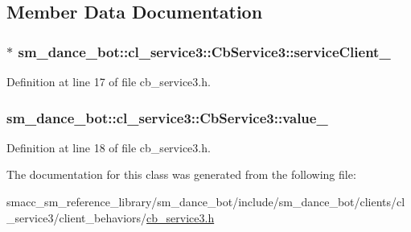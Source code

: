 \subsection{Member Data Documentation}
\subsubsection[{\texorpdfstring{service\+Client\+\_\+}{serviceClient_}}]{$\ast$ sm\+\_\+dance\+\_\+bot\+::cl\+\_\+service3\+::\+Cb\+Service3\+::service\+Client\+\_\+\hspace{0.3cm}{\ttfamily [private]}}\hypertarget{classsm__dance__bot_1_1cl__service3_1_1CbService3_aad53b5aa5eb595c5add3701cfe72079c}{}\label{classsm__dance__bot_1_1cl__service3_1_1CbService3_aad53b5aa5eb595c5add3701cfe72079c}


Definition at line 17 of file cb\+\_\+service3.\+h.

\subsubsection[{\texorpdfstring{value\+\_\+}{value_}}]{ sm\+\_\+dance\+\_\+bot\+::cl\+\_\+service3\+::\+Cb\+Service3\+::value\+\_\+\hspace{0.3cm}{\ttfamily [private]}}\hypertarget{classsm__dance__bot_1_1cl__service3_1_1CbService3_a9df8640d9bc42607256ca76df60a5af0}{}\label{classsm__dance__bot_1_1cl__service3_1_1CbService3_a9df8640d9bc42607256ca76df60a5af0}


Definition at line 18 of file cb\+\_\+service3.\+h.



The documentation for this class was generated from the following file\+:\begin{DoxyCompactItemize}
\item 
smacc\+\_\+sm\+\_\+reference\+\_\+library/sm\+\_\+dance\+\_\+bot/include/sm\+\_\+dance\+\_\+bot/clients/cl\+\_\+service3/client\+\_\+behaviors/\hyperlink{include_2sm__dance__bot_2clients_2cl__service3_2client__behaviors_2cb__service3_8h}{cb\+\_\+service3.\+h}\end{DoxyCompactItemize}
